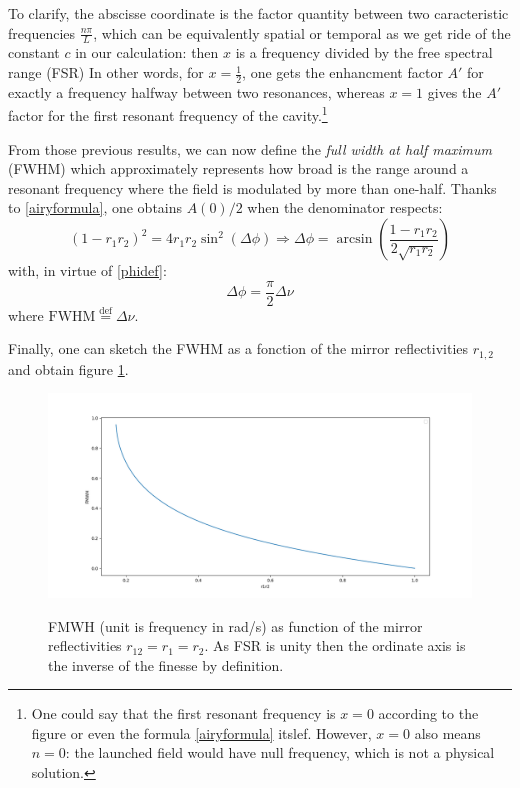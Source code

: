 \documentclass[11pt]{report}
\begin{document}
To clarify, the abscisse coordinate is the factor quantity between two caracteristic frequencies $\frac{n\pi}{L}$, which can be equivalently spatial or temporal as we get ride of the constant $c$ in our calculation: then $x$ is a frequency divided by the free spectral range (FSR) In other words, for $x=\frac{1}{2}$, one gets the enhancment factor $A'$ for exactly a frequency halfway between two resonances, whereas $x=1$ gives the $A'$ factor for the first resonant frequency of the cavity.\footnote{One could say that the first resonant frequency is $x=0$ according to the figure or even the formula \eqref{airyformula} itslef. However, $x=0$ also means $n=0$: the launched field would have null frequency, which is not a physical solution.}

From those previous results, we can now define the \textit{full width at half maximum} (FWHM) which approximately represents how broad is the range around a resonant frequency where the field is modulated by more than one-half. Thanks to \eqref{airyformula}, one obtains $ A(0) / 2$ when the denominator respects:
\begin{equation}
(1 - r_1 r_2)^2 = 4 r_1 r_2 \sin^2(\Delta\phi) \Rightarrow \Delta\phi = \arcsin \left(\frac{1 - r_1 r_2}{2\sqrt{r_1r_2}} \right)
\end{equation}
with, in virtue of \eqref{phidef}:
\begin{equation}
\Delta\phi = \frac{\pi}{2}\Delta\nu
\end{equation}
where $\textrm{FWHM} \stackrel{\text{def}}{=} \Delta\nu$.

Finally, one can sketch the FWHM as a fonction of the mirror reflectivities $r_{1,2}$ and obtain figure \ref{fig:airy-fmwh}.

\begin{figure}[h]
\caption{FMWH (unit is frequency in rad/s) as function of the mirror reflectivities $r_{12} = r_1 = r_2$. As FSR is unity then the ordinate axis is the inverse of the finesse by definition.}
\centering
\includegraphics[width=\textwidth]{airy-fmwh}
\label{fig:airy-fmwh}
\end{figure}
\end{document}
